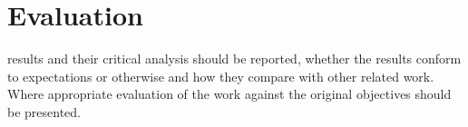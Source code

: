 \chapter{Evaluation}
    results and their critical analysis should be reported, whether the results conform to expectations or otherwise and how they compare with other related work. Where appropriate evaluation of the work against the original objectives should be presented.